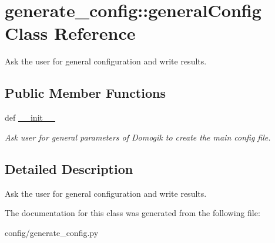 \hypertarget{classgenerate__config_1_1generalConfig}{
\section{generate\_\-config::generalConfig Class Reference}
\label{classgenerate__config_1_1generalConfig}
}
Ask the user for general configuration and write results.  


\subsection*{Public Member Functions}
\begin{CompactItemize}
\item 
\hypertarget{classgenerate__config_1_1generalConfig_470de1124f102c64ad61af244dbac061}{
def \hyperlink{classgenerate__config_1_1generalConfig_470de1124f102c64ad61af244dbac061}{\_\-\_\-init\_\-\_\-}}
\label{classgenerate__config_1_1generalConfig_470de1124f102c64ad61af244dbac061}

\begin{CompactList}\small\item\em Ask user for general parameters of Domogik to create the main config file. \item\end{CompactList}\end{CompactItemize}


\subsection{Detailed Description}
Ask the user for general configuration and write results. 

The documentation for this class was generated from the following file:\begin{CompactItemize}
\item 
config/generate\_\-config.py\end{CompactItemize}
